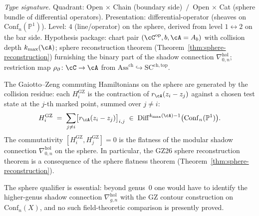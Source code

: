 \begin{theorem}
\label{thm:hdm-face-4}
\emph{Type signature.} Quadrant: Open $\times$ Chain (boundary side)
$\,/\,$ Open $\times$ Cat (sphere bundle of differential operators).
Presentation: differential-operator (sheaves on
$\mathrm{Conf}_n(\mathbb P^1)$). Level: $4$ (line/operator) on the
sphere, derived from level $1\leftrightarrow 2$ on the bar side.
Hypothesis package: chart pair $(\cC^{\mathrm{op}}, b, \cA = A_b)$
with collision depth $k_{\max}(\cA)$; sphere reconstruction theorem
\textup{(}Theorem~\textup{\ref{thm:sphere-reconstruction}}\textup{)}
furnishing the binary part of the shadow connection
$\nabla^{\mathrm{hol}}_{0,n}$; restriction map
$\rho_\partial\colon\cC\to\cA$ from
$\mathrm{Ass}^{\mathrm{ch}}\hookrightarrow\mathrm{SC}^{\mathrm{ch,top}}$.

The Gaiotto--Zeng commuting Hamiltonians on the sphere are
generated by the collision residue: each $H_i^{\mathrm{GZ}}$ is the
contraction of $r_\cA(z_i - z_j)$ against a chosen test state at
the $j$-th marked point, summed over $j \neq i$:
\begin{equation}\label{eq:hdm-face-4}
H_i^{\mathrm{GZ}}
\;=\;
\sum_{j \neq i}
\bigl[ r_\cA(z_i - z_j) \bigr]_{i,j}
\;\in\;
\mathrm{Diff}^{k_{\max}(\cA)-1}\bigl(\mathrm{Conf}_n(\mathbb{P}^1)\bigr).
\end{equation}
The commutativity $[H_i^{\mathrm{GZ}}, H_j^{\mathrm{GZ}}] = 0$ is
the flatness of the modular shadow connection $\nabla^{\mathrm{hol}}_{0,n}$
on the sphere. In particular, the GZ26 sphere reconstruction
theorem is a consequence of the sphere flatness theorem
\textup{(}Theorem~\textup{\ref{thm:sphere-reconstruction})}.
\end{theorem}

The sphere qualifier is essential: beyond genus~$0$ one would have to
identify the higher-genus shadow connection
$\nabla^{\mathrm{hol}}_{g,n}$ with the GZ contour construction on
$\mathrm{Conf}_n(X)$, and no such field-theoretic comparison is presently
proved.

